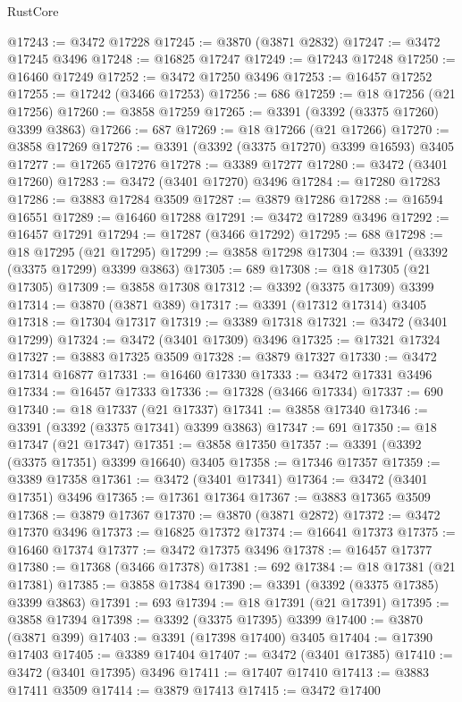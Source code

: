 \begin{lexlean}{RustCore}
\begin{coremodule}
@17243 := @3472 @17228
@17245 := @3870 (@3871 @2832)
@17247 := @3472 @17245 @3496
@17248 := @16825 @17247
@17249 := @17243 @17248
@17250 := @16460 @17249
@17252 := @3472 @17250 @3496
@17253 := @16457 @17252
@17255 := @17242 (@3466 @17253)
@17256 := 686
@17259 := @18 @17256 (@21 @17256)
@17260 := @3858 @17259
@17265 := @3391 (@3392 (@3375 @17260) @3399 @3863)
@17266 := 687
@17269 := @18 @17266 (@21 @17266)
@17270 := @3858 @17269
@17276 := @3391 (@3392 (@3375 @17270) @3399 @16593) @3405
@17277 := @17265 @17276
@17278 := @3389 @17277
@17280 := @3472 (@3401 @17260)
@17283 := @3472 (@3401 @17270) @3496
@17284 := @17280 @17283
@17286 := @3883 @17284 @3509
@17287 := @3879 @17286
@17288 := @16594 @16551
@17289 := @16460 @17288
@17291 := @3472 @17289 @3496
@17292 := @16457 @17291
@17294 := @17287 (@3466 @17292)
@17295 := 688
@17298 := @18 @17295 (@21 @17295)
@17299 := @3858 @17298
@17304 := @3391 (@3392 (@3375 @17299) @3399 @3863)
@17305 := 689
@17308 := @18 @17305 (@21 @17305)
@17309 := @3858 @17308
@17312 := @3392 (@3375 @17309) @3399
@17314 := @3870 (@3871 @389)
@17317 := @3391 (@17312 @17314) @3405
@17318 := @17304 @17317
@17319 := @3389 @17318
@17321 := @3472 (@3401 @17299)
@17324 := @3472 (@3401 @17309) @3496
@17325 := @17321 @17324
@17327 := @3883 @17325 @3509
@17328 := @3879 @17327
@17330 := @3472 @17314 @16877
@17331 := @16460 @17330
@17333 := @3472 @17331 @3496
@17334 := @16457 @17333
@17336 := @17328 (@3466 @17334)
@17337 := 690
@17340 := @18 @17337 (@21 @17337)
@17341 := @3858 @17340
@17346 := @3391 (@3392 (@3375 @17341) @3399 @3863)
@17347 := 691
@17350 := @18 @17347 (@21 @17347)
@17351 := @3858 @17350
@17357 := @3391 (@3392 (@3375 @17351) @3399 @16640) @3405
@17358 := @17346 @17357
@17359 := @3389 @17358
@17361 := @3472 (@3401 @17341)
@17364 := @3472 (@3401 @17351) @3496
@17365 := @17361 @17364
@17367 := @3883 @17365 @3509
@17368 := @3879 @17367
@17370 := @3870 (@3871 @2872)
@17372 := @3472 @17370 @3496
@17373 := @16825 @17372
@17374 := @16641 @17373
@17375 := @16460 @17374
@17377 := @3472 @17375 @3496
@17378 := @16457 @17377
@17380 := @17368 (@3466 @17378)
@17381 := 692
@17384 := @18 @17381 (@21 @17381)
@17385 := @3858 @17384
@17390 := @3391 (@3392 (@3375 @17385) @3399 @3863)
@17391 := 693
@17394 := @18 @17391 (@21 @17391)
@17395 := @3858 @17394
@17398 := @3392 (@3375 @17395) @3399
@17400 := @3870 (@3871 @399)
@17403 := @3391 (@17398 @17400) @3405
@17404 := @17390 @17403
@17405 := @3389 @17404
@17407 := @3472 (@3401 @17385)
@17410 := @3472 (@3401 @17395) @3496
@17411 := @17407 @17410
@17413 := @3883 @17411 @3509
@17414 := @3879 @17413
@17415 := @3472 @17400

\end{coremodule}
\end{lexlean}
